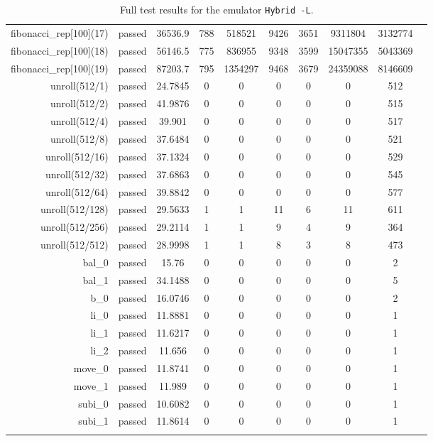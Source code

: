 \begin{longtable}{r|ccccccccc}
    fibonacci\_rep[100](17) & passed & 36536.9 & 788 & 518521 & 9426 & 3651 & 9311804 & 3132774 \\
    fibonacci\_rep[100](18) & passed & 56146.5 & 775 & 836955 & 9348 & 3599 & 15047355 & 5043369 \\
    fibonacci\_rep[100](19) & passed & 87203.7 & 795 & 1354297 & 9468 & 3679 & 24359088 & 8146609 \\
    unroll(512/1) & passed & 24.7845 & 0 & 0 & 0 & 0 & 0 & 512 \\
    unroll(512/2) & passed & 41.9876 & 0 & 0 & 0 & 0 & 0 & 515 \\
    unroll(512/4) & passed & 39.901 & 0 & 0 & 0 & 0 & 0 & 517 \\
    unroll(512/8) & passed & 37.6484 & 0 & 0 & 0 & 0 & 0 & 521 \\
    unroll(512/16) & passed & 37.1324 & 0 & 0 & 0 & 0 & 0 & 529 \\
    unroll(512/32) & passed & 37.6863 & 0 & 0 & 0 & 0 & 0 & 545 \\
    unroll(512/64) & passed & 39.8842 & 0 & 0 & 0 & 0 & 0 & 577 \\
    unroll(512/128) & passed & 29.5633 & 1 & 1 & 11 & 6 & 11 & 611 \\
    unroll(512/256) & passed & 29.2114 & 1 & 1 & 9 & 4 & 9 & 364 \\
    unroll(512/512) & passed & 28.9998 & 1 & 1 & 8 & 3 & 8 & 473 \\
    bal\_0 & passed & 15.76 & 0 & 0 & 0 & 0 & 0 & 2 \\
    bal\_1 & passed & 34.1488 & 0 & 0 & 0 & 0 & 0 & 5 \\
    b\_0 & passed & 16.0746 & 0 & 0 & 0 & 0 & 0 & 2 \\
    li\_0 & passed & 11.8881 & 0 & 0 & 0 & 0 & 0 & 1 \\
    li\_1 & passed & 11.6217 & 0 & 0 & 0 & 0 & 0 & 1 \\
    li\_2 & passed & 11.656 & 0 & 0 & 0 & 0 & 0 & 1 \\
    move\_0 & passed & 11.8741 & 0 & 0 & 0 & 0 & 0 & 1 \\
    move\_1 & passed & 11.989 & 0 & 0 & 0 & 0 & 0 & 1 \\
    subi\_0 & passed & 10.6082 & 0 & 0 & 0 & 0 & 0 & 1 \\
    subi\_1 & passed & 11.8614 & 0 & 0 & 0 & 0 & 0 & 1 \\
    
    \bottomrule
    \caption{Full test results for the emulator \texttt{Hybrid -L}.}
    \label{tbl:full-test-output-hybrid-L}
\end{longtable}

